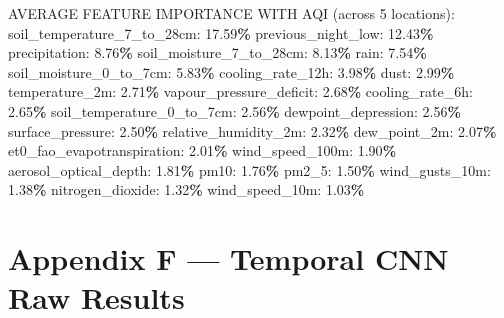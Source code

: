 \documentclass[
  letterpaper,
  DIV=11,
  numbers=noendperiod]{scrartcl}
\newenvironment{Shaded}{\begin{snugshade}}{\end{snugshade}}
\newcommand{\DecValTok}[1]{\textcolor[rgb]{0.00,0.00,0.81}{#1}}
\newcommand{\FloatTok}[1]{\textcolor[rgb]{0.00,0.00,0.81}{#1}}
\newcommand{\NormalTok}[1]{#1}
\newcommand{\OperatorTok}[1]{\textcolor[rgb]{0.81,0.36,0.00}{\textbf{#1}}}
\begin{document}
\begin{Shaded}
\begin{Highlighting}[]
\NormalTok{AVERAGE FEATURE IMPORTANCE WITH AQI (across }\DecValTok{5}\NormalTok{ locations):}
\NormalTok{  soil\_temperature\_7\_to\_28cm: }\FloatTok{17.59}\OperatorTok{\%}
\NormalTok{  previous\_night\_low: }\FloatTok{12.43}\OperatorTok{\%}
\NormalTok{  precipitation: }\FloatTok{8.76}\OperatorTok{\%}
\NormalTok{  soil\_moisture\_7\_to\_28cm: }\FloatTok{8.13}\OperatorTok{\%}
\NormalTok{  rain: }\FloatTok{7.54}\OperatorTok{\%}
\NormalTok{  soil\_moisture\_0\_to\_7cm: }\FloatTok{5.83}\OperatorTok{\%}
\NormalTok{  cooling\_rate\_12h: }\FloatTok{3.98}\OperatorTok{\%}
\NormalTok{  dust: }\FloatTok{2.99}\OperatorTok{\%}
\NormalTok{  temperature\_2m: }\FloatTok{2.71}\OperatorTok{\%}
\NormalTok{  vapour\_pressure\_deficit: }\FloatTok{2.68}\OperatorTok{\%}
\NormalTok{  cooling\_rate\_6h: }\FloatTok{2.65}\OperatorTok{\%}
\NormalTok{  soil\_temperature\_0\_to\_7cm: }\FloatTok{2.56}\OperatorTok{\%}
\NormalTok{  dewpoint\_depression: }\FloatTok{2.56}\OperatorTok{\%}
\NormalTok{  surface\_pressure: }\FloatTok{2.50}\OperatorTok{\%}
\NormalTok{  relative\_humidity\_2m: }\FloatTok{2.32}\OperatorTok{\%}
\NormalTok{  dew\_point\_2m: }\FloatTok{2.07}\OperatorTok{\%}
\NormalTok{  et0\_fao\_evapotranspiration: }\FloatTok{2.01}\OperatorTok{\%}
\NormalTok{  wind\_speed\_100m: }\FloatTok{1.90}\OperatorTok{\%}
\NormalTok{  aerosol\_optical\_depth: }\FloatTok{1.81}\OperatorTok{\%}
\NormalTok{  pm10: }\FloatTok{1.76}\OperatorTok{\%}
\NormalTok{  pm2\_5: }\FloatTok{1.50}\OperatorTok{\%}
\NormalTok{  wind\_gusts\_10m: }\FloatTok{1.38}\OperatorTok{\%}
\NormalTok{  nitrogen\_dioxide: }\FloatTok{1.32}\OperatorTok{\%}
\NormalTok{  wind\_speed\_10m: }\FloatTok{1.03}\OperatorTok{\%}
\end{Highlighting}
\end{Shaded}

\section{Appendix F --- Temporal CNN Raw
Results}\label{appendix-f-temporal-cnn-raw-results}
\end{document}
